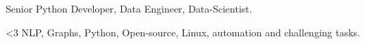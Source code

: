 

\begin{cvparagraph}

Senior Python Developer, Data Engineer, Data-Scientist.

<3 NLP, Graphs, Python, Open-source, Linux, automation and challenging tasks.
\end{cvparagraph}

